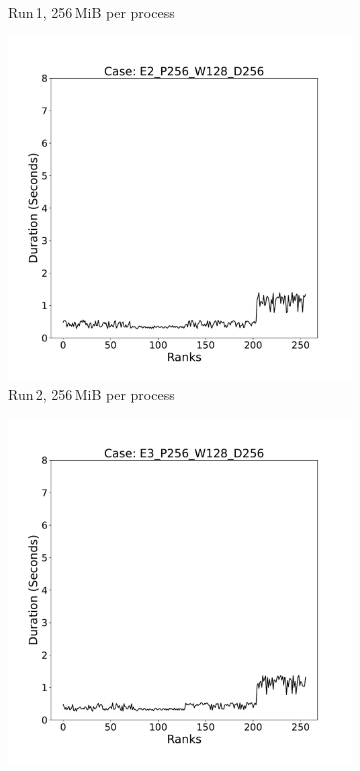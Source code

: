 \begin{figure}[h!]
\begin{subfigure}[b]{0.3\textwidth}
         \caption{Run\,1, 256\,MiB per process }
         \label{fig:E1_256}
     \end{subfigure}
     \hfill
     \begin{subfigure}[b]{0.3\textwidth}
         \centering
         \includegraphics[width=\textwidth, height=\textwidth]{figures/E2_P256_W128_D256.pdf}
         \caption{Run\,2, 256\,MiB per process}
         \label{fig:E2_256}
     \end{subfigure}
      \hfill
     \begin{subfigure}[b]{0.3\textwidth}
         \centering
         \includegraphics[width=\textwidth, height=\textwidth]{figures/E3_P256_W128_D256.pdf}

\end{subfigure}
\end{figure}
